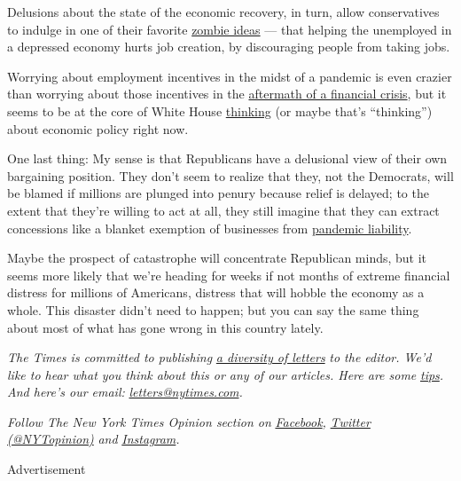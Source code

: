 Delusions about the state of the economic recovery, in turn, allow
conservatives to indulge in one of their favorite
\href{https://wwnorton.com/books/9781324005018}{zombie ideas} --- that
helping the unemployed in a depressed economy hurts job creation, by
discouraging people from taking jobs.

Worrying about employment incentives in the midst of a pandemic is even
crazier than worrying about those incentives in the
\href{https://www.nytimes.com/2010/07/05/opinion/05krugman.html}{aftermath
of a financial crisis}, but it seems to be at the core of White House
\href{https://twitter.com/paulkrugman/status/1282737752828764161}{thinking}
(or maybe that's ``thinking'') about economic policy right now.

One last thing: My sense is that Republicans have a delusional view of
their own bargaining position. They don't seem to realize that they, not
the Democrats, will be blamed if millions are plunged into penury
because relief is delayed; to the extent that they're willing to act at
all, they still imagine that they can extract concessions like a blanket
exemption of businesses from
\href{https://www.cnn.com/2020/07/13/politics/covid-aid-congress-mitch-mcconnell/index.html}{pandemic
liability}.

Maybe the prospect of catastrophe will concentrate Republican minds, but
it seems more likely that we're heading for weeks if not months of
extreme financial distress for millions of Americans, distress that will
hobble the economy as a whole. This disaster didn't need to happen; but
you can say the same thing about most of what has gone wrong in this
country lately.

\emph{The Times is committed to publishing}
\href{https://www.nytimes.com/2019/01/31/opinion/letters/letters-to-editor-new-york-times-women.html}{\emph{a
diversity of letters}} \emph{to the editor. We'd like to hear what you
think about this or any of our articles. Here are some}
\href{https://help.nytimes.com/hc/en-us/articles/115014925288-How-to-submit-a-letter-to-the-editor}{\emph{tips}}\emph{.
And here's our email:}
\href{mailto:letters@nytimes.com}{\emph{letters@nytimes.com}}\emph{.}

\emph{Follow The New York Times Opinion section on}
\href{https://www.facebook.com/nytopinion}{\emph{Facebook}}\emph{,}
\href{http://twitter.com/NYTOpinion}{\emph{Twitter (@NYTopinion)}}
\emph{and}
\href{https://www.instagram.com/nytopinion/}{\emph{Instagram}}\emph{.}

Advertisement

